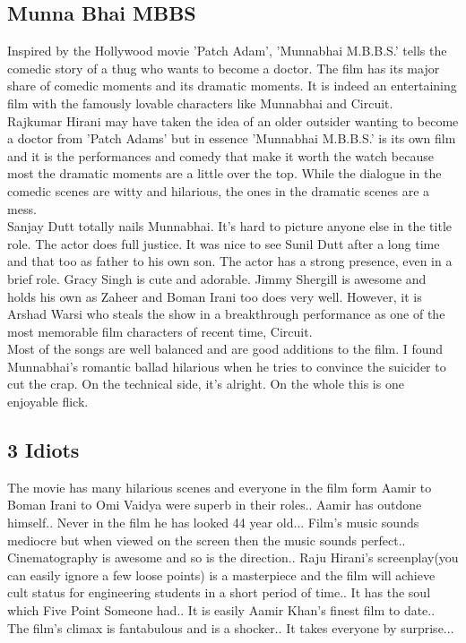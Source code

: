 \documentclass{article}
\begin{document}
\subsection{Munna Bhai MBBS}
Inspired by the Hollywood movie 'Patch Adam', 'Munnabhai M.B.B.S.' tells the comedic story of a thug who wants to become a doctor. The film has its major share of comedic moments and its dramatic moments. It is indeed an entertaining film with the famously lovable characters like Munnabhai and Circuit. 
\\
Rajkumar Hirani may have taken the idea of an older outsider wanting to become a doctor from 'Patch Adams' but in essence 'Munnabhai M.B.B.S.' is its own film and it is the performances and comedy that make it worth the watch because most the dramatic moments are a little over the top. While the dialogue in the comedic scenes are witty and hilarious, the ones in the dramatic scenes are a mess.
\\
Sanjay Dutt totally nails Munnabhai. It's hard to picture anyone else in the title role. The actor does full justice. It was nice to see Sunil Dutt after a long time and that too as father to his own son. The actor has a strong presence, even in a brief role. Gracy Singh is cute and adorable. Jimmy Shergill is awesome and holds his own as Zaheer and Boman Irani too does very well. However, it is Arshad Warsi who steals the show in a breakthrough performance as one of the most memorable film characters of recent time, Circuit.
\\
Most of the songs are well balanced and are good additions to the film. I found Munnabhai's romantic ballad hilarious when he tries to convince the suicider to cut the crap. On the technical side, it's alright. On the whole this is one enjoyable flick.
\subsection{3 Idiots}
The movie has many hilarious scenes and everyone in the film form Aamir to Boman Irani to Omi Vaidya were superb in their roles.. Aamir has outdone himself.. Never in the film he has looked 44 year old... Film's music sounds mediocre but when viewed on the screen then the music sounds perfect.. Cinematography is awesome and so is the direction.. Raju Hirani's screenplay(you can easily ignore a few loose points) is a masterpiece and the film will achieve cult status for engineering students in a short period of time.. It has the soul which Five Point Someone had.. It is easily Aamir Khan's finest film to date.. The film's climax is fantabulous and is a shocker.. It takes everyone by surprise...
\end{document}

